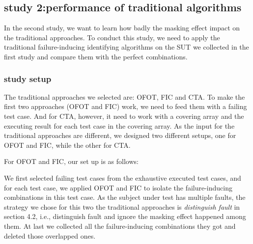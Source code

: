 \documentclass{sig-alternate}
\begin{document}
\subsection{study 2:performance of traditional algorithms}
In the second study, we want to learn how badly the masking effect impact on the traditional approaches. To conduct this study, we need to apply the traditional failure-inducing identifying algorithms on the SUT we collected in the first study and compare them with the perfect combinations.


%


\subsubsection{study setup}
The traditional approaches we selected are: OFOT, FIC and CTA. To make the first two approaches (OFOT and FIC) work, we need to feed them with a failing test case. And for CTA, however, it need to work with a covering array and the executing result for each test case in the covering array. As the input for the traditional approaches are different, we designed two different setups, one for OFOT and FIC, while the other for CTA.

For OFOT and FIC, our set up is as follows:

We first selected failing test cases from the exhaustive executed test cases, and for each test case, we applied OFOT and FIC to isolate the failure-inducing combinations in this test case. As the subject under test has multiple faults, the strategy we chose for this two the traditional approaches is \emph{distinguish fault} in section 4.2, i.e., distinguish fault and ignore the masking effect happened among them. At last we collected all the failure-inducing combinations they got and deleted those overlapped ones.
\end{document}
